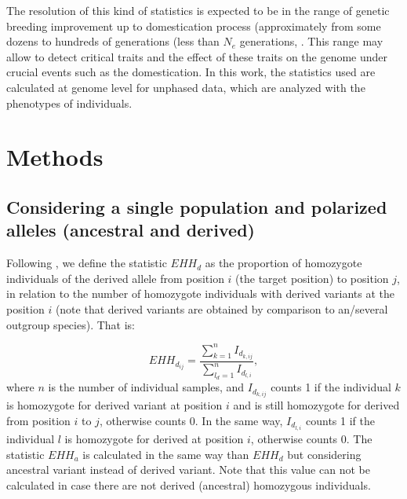 \documentclass[a4paper,11pt]{article}
\begin{document}

The resolution of this kind of statistics is expected to be in the range of genetic breeding improvement up to domestication process (approximately from some dozens to hundreds of generations (less than $N_e$ generations, \citep{Sabeti:2002aa}. This range may allow to detect critical traits and the effect of these traits on the genome under crucial events such as the domestication. In this work, the statistics used are calculated at genome level for unphased data, which are analyzed with the phenotypes of individuals.

\section{Methods}
\subsection{Considering a single population and polarized alleles (ancestral and derived)}
Following \citet{Sabeti:2002aa}, we define the statistic $EHH_d$ as the proportion of homozygote individuals of the derived allele from position $i$ (the target position) to position $j$, in relation to the number of homozygote individuals with derived variants at the position $i$ (note that derived variants are obtained by comparison to an/several outgroup species).  That is:

 \begin{equation}
 EHH_{d_{ij}} = \frac{\sum_{k=1}^{n}I_{d_{k,ij}}}{\sum_{l_d=1}^{n}I_{d_{l,i}}},
 \end{equation}
where $n$ is the number of individual samples, and $I_{d_{k,ij}}$ counts 1 if the individual $k$ is homozygote for derived variant at position $i$ and is still homozygote for derived from position $i$ to $j$, otherwise counts 0. In the same way, $I_{d_{l,i}}$ counts 1 if the individual $l$ is homozygote for derived at position $i$, otherwise counts 0. The statistic $EHH_a$ is calculated in the same way than $EHH_d$ but considering ancestral variant instead of derived variant.  %
Note that this value can not be calculated in case there are not derived (ancestral) homozygous individuals.
\end{document}
